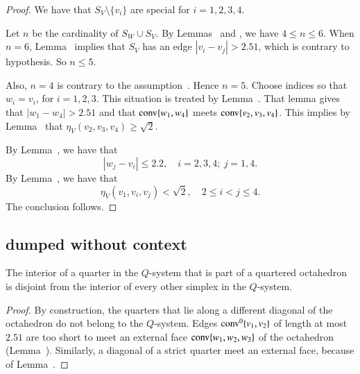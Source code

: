 \begin{tarskidata}
\begin{tarski}
\begin{proof}
We have that $S_V\setminus\{v_i\}$ are
special for $i=1,2,3,4$.

Let $n$ be the cardinality of $S_W\cup S_V$.  By Lemmas~
and , we have $4\le n\le 6$.  When
$n=6$, Lemma~ implies that $S_V$ has an edge
$|v_i-v_j|>2.51$, which is contrary to hypothesis.  So $n\le 5$.

Also, $n=4$ is contrary to the assumption~. 
Hence $n=5$.  
Choose indices so that $w_i=v_i$, for $i=1,2,3$. 
This situation is treated by Lemma~.
That lemma gives that $|w_1-w_4|>2.51$ and that
  ${\operatorname{conv}}\{w_1,w_4\}$ meets ${\operatorname{conv}}\{v_2,v_3,v_4\}$.
This implies by Lemma~ that 
$\eta_V(v_2,v_3,v_4)\ge\sqrt2$.

By Lemma~, we have that 
$$|w_j-v_i|\le 2.2,\quad i=2,3,4;\ j=1,4.$$
By Lemma~, we have that 
 $$\eta_V(v_1,v_i,v_j) < \sqrt2,\quad 2\le i < j \le 4.$$
The conclusion follows.
\end{proof}
\end{tarski}



\begin{tarski}
\subsection{dumped without context}

\begin{lemma} 
The interior of a quarter in the $Q$-system that is part of a
quartered octahedron is disjoint from the interior of every other
simplex in the $Q$-system.
\end{lemma}

\begin{proof} By construction, the quarters that lie along a
different diagonal of the octahedron do not belong to the
$Q$-system.  Edges ${\operatorname{conv}}^0\{v_1,v_2\}$  
of length at most $2.51$ are too short to meet
an external face ${\operatorname{conv}}\{w_1,w_2,w_3\}$ of the octahedron
(Lemma~). Similarly, a diagonal of a
strict quarter meet an external face,
because of Lemma~.
\end{proof}
\end{tarski}




\end{tarskidata}
